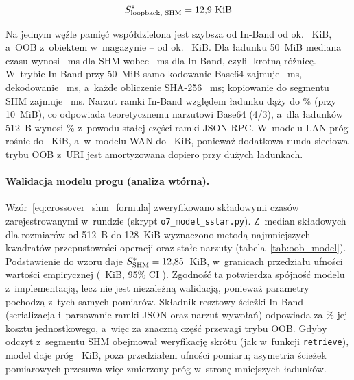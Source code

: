 \begin{equation}
S^*_{\text{loopback, SHM}} = 12{,}9\ \text{KiB}
\label{eq:empiryczny_crossover}
\end{equation}

Na jednym węźle pamięć współdzielona jest szybsza od In-Band od ok. \wynSstarLoopShm~KiB, a~OOB z~obiektem w~magazynie -- od ok. \wynSstarLoopHttp~KiB. Dla ładunku 50~MiB mediana czasu wynosi \wynFiftyShm~ms dla SHM wobec \wynFiftyInband~ms dla In-Band, czyli \wynSpeedupFifty-krotną różnicę. W~trybie In-Band przy 50~MiB samo kodowanie Base64 zajmuje \wynFiftyEnc~ms, dekodowanie \wynFiftyDec~ms, a~każde obliczenie SHA-256 \wynFiftySha~ms; kopiowanie do segmentu SHM zajmuje \wynFiftyShmCopy~ms. Narzut ramki In-Band względem ładunku dąży do \wynFrameOverheadTen\% (przy 10~MiB), co odpowiada teoretycznemu narzutowi Base64 (4/3), a~dla ładunków 512~B wynosi \wynFrameOverheadSmall\% z~powodu stałej części ramki JSON-RPC. W~modelu LAN próg rośnie do \wynSstarLan~KiB, a~w~modelu WAN do \wynSstarWan~KiB, ponieważ dodatkowa runda sieciowa trybu OOB z~URI jest amortyzowana dopiero przy dużych ładunkach.

\paragraph{Walidacja modelu progu (analiza wtórna).} Wzór~\eqref{eq:crossover_shm_formula} zweryfikowano składowymi czasów zarejestrowanymi w~rundzie (skrypt \texttt{o7\_model\_sstar.py}). Z~median składowych dla rozmiarów od 512~B do 128~KiB wyznaczono metodą najmniejszych kwadratów przepustowości operacji oraz stałe narzuty (tabela~\ref{tab:oob_model}). Podstawienie do wzoru daje $S^*_{\text{SHM}} = 12{,}85$~KiB, w~granicach przedziału ufności wartości empirycznej (\wynSstarLoopShm~KiB, 95\% CI \wynSstarCiLoopShm). Zgodność ta potwierdza spójność modelu z~implementacją, lecz nie jest niezależną walidacją, ponieważ parametry pochodzą z~tych samych pomiarów. Składnik resztowy ścieżki In-Band (serializacja i~parsowanie ramki JSON oraz narzut wywołań) odpowiada za \wynOsevenResidShare\% jej kosztu jednostkowego, a~więc za znaczną część przewagi trybu OOB. Gdyby odczyt z~segmentu SHM obejmował weryfikację skrótu (jak w~funkcji \texttt{retrieve}), model daje próg \wynOsevenModelVerify~KiB, poza przedziałem ufności pomiaru; asymetria ścieżek pomiarowych przesuwa więc zmierzony próg w~stronę mniejszych ładunków.

